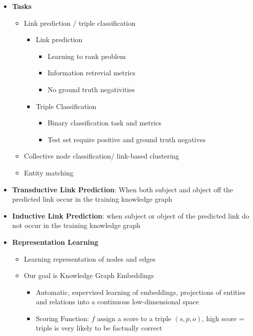 \begin{itemize}
    \item \textbf{Tasks}
    \begin{itemize}
        \item Link prediction / triple classification
        \begin{itemize}
            \item Link prediction
            \begin{itemize}
                \item Learning to rank problem
                \item Information retrevial metrics
                \item No ground truth negativities
            \end{itemize}
            \item Triple Classification
            \begin{itemize}
                \item Binary classification task and metrics
                \item Test set require positive and ground truth negatives
            \end{itemize}
        \end{itemize}
        \item Collective node classification/ link-based clustering
        \item Entity matching
    \end{itemize}
    \item \textbf{Transductive Link Prediction}: When both subject and object off the predicted link occur in the training knowledge graph
    \item \textbf{Inductive Link Prediction}: when subject or object of the predicted link do not occur in the training knowledge graph
    \item \textbf{Representation Learning}
    \begin{itemize}
        \item Learning representation of nodes and edges
        \item Our goal is Knowledge Graph Embeddings
        \begin{itemize}
            \item Automatic, supervised learning of embeddings, projections of entities and relations into a continuous low-dimensional space
            \item Scoring Function: \(f\) assign a score to a triple \((s,p,o)\), high score = triple is very likely to be factually correct

\end{itemize}
\end{itemize}
\end{itemize}

